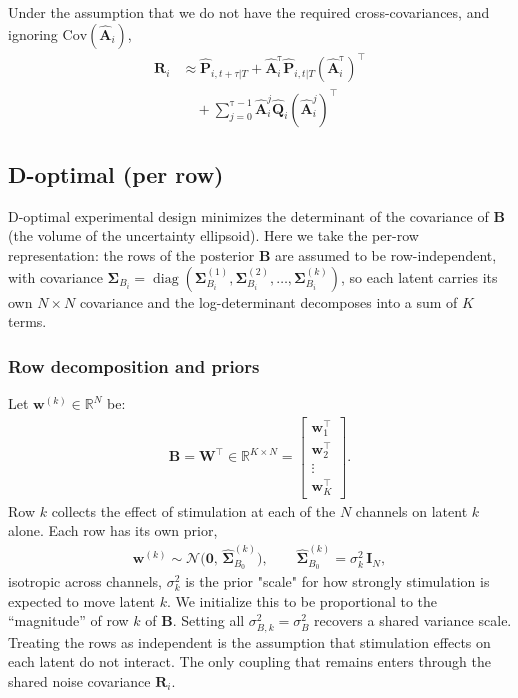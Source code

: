 \documentclass[11pt,letterpaper]{article} %
\begin{document}
Under the assumption that we do not have the required cross-covariances, and ignoring $\mathrm{Cov}(\hat{\bm{A}}_i)$,
\begin{align*}
    \bm{R}_i
    &\approx
    \hat{\bm{P}}_{i,t+\tau|T}
    +
    \hat{\bm{A}}_i^{\mathrm{\tau}}
    \hat{\bm{P}}_{i,t|T}
    \left(\hat{\bm{A}}_i^{\mathrm{\tau}}\right)^\top
    \\
    &\quad
    +
    \sum_{j=0}^{\mathrm{\tau}-1}
    \hat{\bm{A}}_i^j
    \hat{\bm{Q}}_i
    \left(\hat{\bm{A}}_i^j\right)^\top
\end{align*}
\clearpage
\subsection*{D-optimal (per row)}

D-optimal experimental design minimizes the determinant of the covariance of $\bm{B}$ (the volume of the uncertainty ellipsoid). Here we take the per-row representation: the rows of the posterior $\bm{B}$ are assumed to be row-independent, with covariance $\bm{\Sigma}_{B_i} = \operatorname{diag}(\bm{\Sigma}_{B_i}^{(1)}, \bm{\Sigma}_{B_i}^{(2)}, \dots, \bm{\Sigma}_{B_i}^{(k)})$, so each latent carries its own $N\times N$ covariance and the log-determinant decomposes into a sum of $K$ terms.

\subsubsection*{Row decomposition and priors}
Let $\bm{w}^{(k)} \in \mathbb{R}^{N}$ be:
\begin{align*}
    \bm{B} = \bm{W}^\top \in \mathbb{R}^{K\times N} =
    \begin{bmatrix}\bm{w}_1^\top \\ \bm{w}_2^\top \\ \vdots \\ \bm{w}_K^\top\end{bmatrix}.
\end{align*}
Row $k$ collects the effect of stimulation at each of the $N$ channels on latent $k$ alone. Each row has its own prior,
\begin{align*}
    \bm{w}^{(k)} \sim \mathcal{N}\big(\bm{0},\, \hat{\bm{\Sigma}}_{B_0}^{(k)}\big),
    \qquad \hat{\bm{\Sigma}}_{B_0}^{(k)} = \sigma_k^2\,\bm{I}_N,
\end{align*}
isotropic across channels, $\sigma_k^2$ is the prior "scale" for how strongly stimulation is expected to move latent $k$. We initialize this to be proportional to the ``magnitude'' of row $k$ of
$\bm{B}$. Setting all $\sigma_{B, k}^2 = \sigma_B^2$ recovers a shared variance scale. Treating the rows as independent is the assumption that stimulation effects on each latent do not interact. The only coupling that remains enters through the shared noise covariance $\bm{R}_i$.
\end{document}
